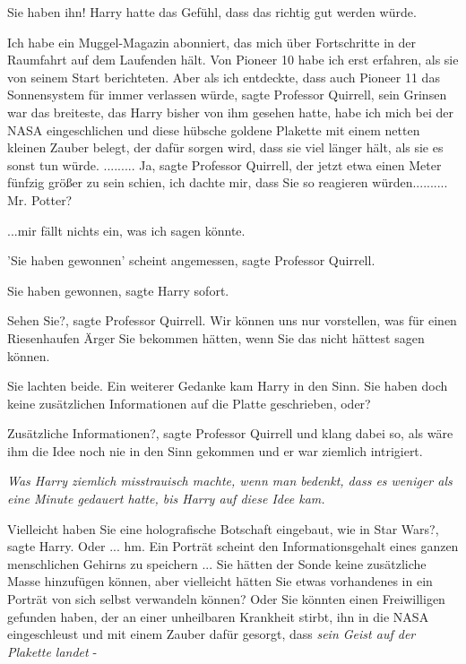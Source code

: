 \glqq Sie haben ihn!\grqq{} Harry hatte das Gefühl, dass das richtig gut werden
würde.

\glqq Ich habe ein Muggel-Magazin abonniert, das mich über Fortschritte in der
Raumfahrt auf dem Laufenden hält. Von Pioneer 10 habe ich erst erfahren, als sie
von seinem Start berichteten. Aber als ich entdeckte, dass auch Pioneer 11 das
Sonnensystem für immer verlassen würde\grqq{}, sagte Professor Quirrell, sein
Grinsen war das breiteste, das Harry bisher von ihm gesehen hatte, \glqq habe
ich mich bei der NASA eingeschlichen und diese hübsche goldene Plakette mit
einem netten kleinen Zauber belegt, der dafür sorgen wird, dass sie viel länger
hält, als sie es sonst tun würde. \glqq ......... \glqq Ja\grqq{}, sagte
Professor Quirrell, der jetzt etwa einen Meter fünfzig größer zu sein schien,
\glqq ich dachte mir, dass Sie so reagieren würden.\grqq{}......... \glqq Mr.
Potter?\grqq{}

\glqq ...mir fällt nichts ein, was ich sagen könnte.\grqq{}

\glqq 'Sie haben gewonnen' scheint angemessen\grqq{}, sagte Professor Quirrell.

\glqq Sie haben gewonnen\grqq{}, sagte Harry sofort.

\glqq Sehen Sie?\grqq{}, sagte Professor Quirrell. \glqq Wir können uns nur
vorstellen, was für einen Riesenhaufen Ärger Sie bekommen hätten, wenn Sie das
nicht hättest sagen können.\grqq{}

Sie lachten beide. Ein weiterer Gedanke kam Harry in den Sinn. \glqq Sie haben
doch keine zusätzlichen Informationen auf die Platte geschrieben, oder?\grqq{}

\glqq Zusätzliche Informationen?\grqq{}, sagte Professor Quirrell und klang
dabei so, als wäre ihm die Idee noch nie in den Sinn gekommen und er war
ziemlich intrigiert.

\emph{Was Harry ziemlich misstrauisch machte, wenn man bedenkt, dass es weniger
als eine Minute gedauert hatte, bis Harry auf diese Idee kam. }

\glqq Vielleicht haben Sie eine holografische Botschaft eingebaut, wie in Star
Wars?\grqq{}, sagte Harry. \glqq Oder ... hm. Ein Porträt scheint den
Informationsgehalt eines ganzen menschlichen Gehirns zu speichern ... Sie hätten
der Sonde keine zusätzliche Masse hinzufügen können, aber vielleicht hätten Sie
etwas vorhandenes in ein Porträt von sich selbst verwandeln können? Oder Sie
könnten einen Freiwilligen gefunden haben, der an einer unheilbaren Krankheit
stirbt, ihn in die NASA eingeschleust und mit einem Zauber dafür gesorgt,
dass \emph{sein Geist auf der Plakette landet} -\grqq{}

